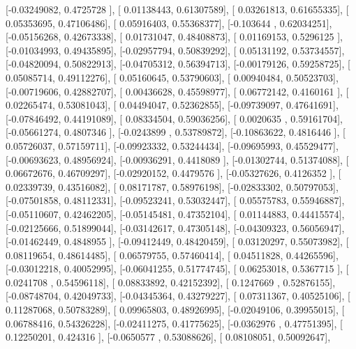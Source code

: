 \documentclass{article}
\begin{document}
       [-0.03249082,  0.4725728 ],
       [ 0.01138443,  0.61307589],
       [ 0.03261813,  0.61655335],
       [ 0.05353695,  0.47106486],
       [ 0.05916403,  0.55368377],
       [-0.103644  ,  0.62034251],
       [-0.05156268,  0.42673338],
       [ 0.01731047,  0.48408873],
       [ 0.01169153,  0.5296125 ],
       [-0.01034993,  0.49435895],
       [-0.02957794,  0.50839292],
       [ 0.05131192,  0.53734557],
       [-0.04820094,  0.50822913],
       [-0.04705312,  0.56394713],
       [-0.00179126,  0.59258725],
       [ 0.05085714,  0.49112276],
       [ 0.05160645,  0.53790603],
       [ 0.00940484,  0.50523703],
       [-0.00719606,  0.42882707],
       [ 0.00436628,  0.45598977],
       [ 0.06772142,  0.4160161 ],
       [ 0.02265474,  0.53081043],
       [ 0.04494047,  0.52362855],
       [-0.09739097,  0.47641691],
       [-0.07846492,  0.44191089],
       [ 0.08334504,  0.59036256],
       [ 0.0020635 ,  0.59161704],
       [-0.05661274,  0.4807346 ],
       [-0.0243899 ,  0.53789872],
       [-0.10863622,  0.4816446 ],
       [ 0.05726037,  0.57159711],
       [-0.09923332,  0.53244434],
       [-0.09695993,  0.45529477],
       [-0.00693623,  0.48956924],
       [-0.00936291,  0.4418089 ],
       [-0.01302744,  0.51374088],
       [ 0.06672676,  0.46709297],
       [-0.02920152,  0.4479576 ],
       [-0.05327626,  0.4126352 ],
       [ 0.02339739,  0.43516082],
       [ 0.08171787,  0.58976198],
       [-0.02833302,  0.50797053],
       [-0.07501858,  0.48112331],
       [-0.09523241,  0.53032447],
       [ 0.05575783,  0.55946887],
       [-0.05110607,  0.42462205],
       [-0.05145481,  0.47352104],
       [ 0.01144883,  0.44415574],
       [-0.02125666,  0.51899044],
       [-0.03142617,  0.47305148],
       [-0.04309323,  0.56056947],
       [-0.01462449,  0.4848955 ],
       [-0.09412449,  0.48420459],
       [ 0.03120297,  0.55073982],
       [ 0.08119654,  0.48614485],
       [ 0.06579755,  0.57460414],
       [ 0.04511828,  0.44265596],
       [-0.03012218,  0.40052995],
       [-0.06041255,  0.51774745],
       [ 0.06253018,  0.5367715 ],
       [ 0.0241708 ,  0.54596118],
       [ 0.08833892,  0.42152392],
       [ 0.1247669 ,  0.52876155],
       [-0.08748704,  0.42049733],
       [-0.04345364,  0.43279227],
       [ 0.07311367,  0.40525106],
       [ 0.11287068,  0.50783289],
       [ 0.09965803,  0.48926995],
       [-0.02049106,  0.39955015],
       [ 0.06788416,  0.54326228],
       [-0.02411275,  0.41775625],
       [-0.0362976 ,  0.47751395],
       [ 0.12250201,  0.424316  ],
       [-0.0650577 ,  0.53088626],
       [ 0.08108051,  0.50092647],
\end{document}
